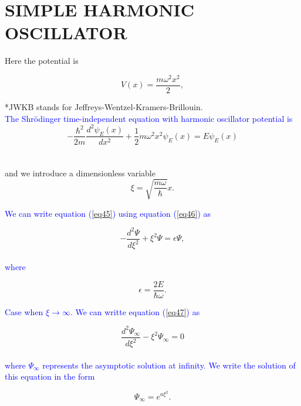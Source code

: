\documentclass{article}
\begin{document}
\section{SIMPLE HARMONIC OSCILLATOR}

Here the potential is

\begin{equation}
 V(x)=\frac{m \omega^{2} x^{2}}{2},  
\end{equation}

*JWKB stands for Jeffreys-Wentzel-Kramers-Brillouin.
\\

\textcolor{blue}{The Shrödinger time-independent equation with harmonic oscillator potential is}
\begin{equation}
    -\frac{\hbar^{2}}{2 m} \frac{d^{2} \psi_E(x)}{d x^{2}}+\frac{1}{2} m \omega^{2} x^{2} \psi_E(x)=E \psi_E(x)
    \label{eq45}
\end{equation}
\\
\\
and we introduce a dimensionless variable
\begin{equation}
\xi=\sqrt{\frac{m \omega}{\hbar}} x.
\label{eq46}
\end{equation}

\textcolor{blue}{We can write equation (\ref{eq45}) using equation (\ref{eq46}) as}

\begin{equation}
    -\frac{d^{2} \Psi}{d \xi^{2}}+\xi^{2} \Psi=\epsilon \Psi,
    \label{eq47}
\end{equation}
\\
\textcolor{blue}{where}

\begin{equation}
    \epsilon=\frac{2 E}{\hbar \omega}.
\end{equation}

\textcolor{blue}{Case when $\xi \rightarrow \infty$. We can writte equation (\ref{eq47}) as}

\begin{equation}
    \frac{d^{2} \Psi_{\infty}}{d \xi^{2}}-\xi^{2} \Psi_{\infty}=0
    \label{eq49}
\end{equation}
\\
\textcolor{blue}{where $\Psi_{\infty}$ represents the asymptotic solution at infinity. We write the solution of this equation in the form}

\begin{equation}
    \Psi_{\infty}=e^{a \xi^{2}}.
\end{equation}
\end{document}

